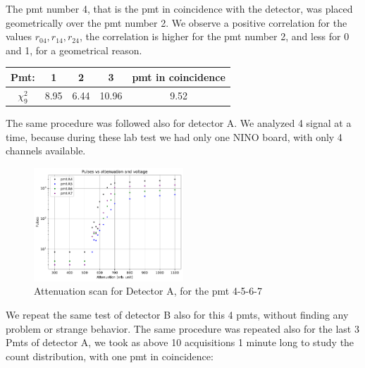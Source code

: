 The pmt number 4, that is the pmt in coincidence with the detector, was placed geometrically over the pmt number 2. 
We observe a positive correlation for the values $r_{04},r_{14},r_{24}$, the correlation is higher for the pmt number 2, and less for 0 and 1, for a geometrical reason. \smallskip

\begingroup
\setlength{\tabcolsep}{8pt} %
\renewcommand{\arraystretch}{1.2} %
\begin{center}
\begin{tabular}{|c|c|c|c|c|}
\hline 
Pmt: & 1 & 2 & 3 & pmt in coincidence \\ 
\hline
$\chi^{2}_{9}$ & 8.95 & 6.44 & 10.96 & 9.52\\ 
\hline
\end{tabular} 
\end{center}
\endgroup
\smallskip


The same procedure was followed also for detector A. We analyzed 4 signal at a time, because during these lab test we had only one NINO board, with only 4 channels available.
\begin{figure}[hbtp]
\centering
\includegraphics[width = 0.5\textwidth]{Analysis/AttenuationA(4-7).pdf}
\caption{Attenuation scan for Detector A, for the pmt 4-5-6-7}
\end{figure}

We repeat the same test of detector B also for this 4 pmts, without finding any problem or strange behavior. The same procedure was repeated also for the last 3 Pmts of detector A, we took as above 10 acquisitions 1 minute long to study the count distribution, with one pmt in coincidence:

